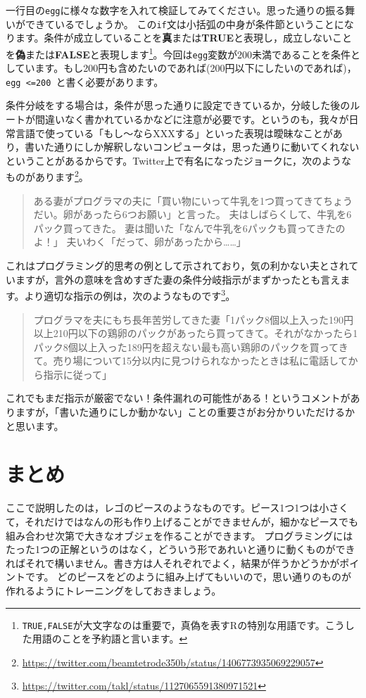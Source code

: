 \documentclass{ltjsbook}
\begin{document}
一行目の\verb|egg|に様々な数字を入れて検証してみてください。思った通りの振る舞いができているでしょうか。
この\texttt{if}文は小括弧の中身が条件節ということになります。条件が成立していることを\textbf{真}または\textbf{TRUE}と表現し，成立しないことを\textbf{偽}または\textbf{FALSE}と表現します\footnote{\texttt{TRUE,FALSE}が大文字なのは重要で，真偽を表すRの特別な用語です。こうした用語のことを予約語と言います。}。今回は\verb|egg|変数が200未満であることを条件としています。もし200円も含めたいのであれば(200円以下にしたいのであれば)，\verb|egg <=200 |と書く必要があります。

条件分岐をする場合は，条件が思った通りに設定できているか，分岐した後のルートが間違いなく書かれているかなどに注意が必要です。というのも，我々が日常言語で使っている「もし〜ならXXXする」といった表現は曖昧なことがあり，書いた通りにしか解釈しないコンピュータは，思った通りに動いてくれないということがあるからです。Twitter上で有名になったジョークに，次のようなものがあります\footnote{\url{https://twitter.com/beamtetrode350b/status/1406773935069229057}}。

\begin{quote}
ある妻がプログラマの夫に「買い物にいって牛乳を1つ買ってきてちょうだい。卵があったら6つお願い」と言った。
夫はしばらくして、牛乳を6パック買ってきた。
妻は聞いた「なんで牛乳を6パックも買ってきたのよ！」
夫いわく「だって、卵があったから……」
\end{quote}

これはプログラミング的思考の例として示されており，気の利かない夫とされていますが，言外の意味を含めすぎた妻の条件分岐指示がまずかったとも言えます。より適切な指示の例は，次のようなものです\footnote{\url{https://twitter.com/takl/status/1127065591380971521}}。

\begin{quote}
プログラマを夫にもち長年苦労してきた妻「1パック8個以上入った190円以上210円以下の鶏卵のパックがあったら買ってきて。それがなかったら1パック8個以上入った189円を超えない最も高い鶏卵のパックを買ってきて。売り場について15分以内に見つけられなかったときは私に電話してから指示に従って」
\end{quote}

これでもまだ指示が厳密でない！条件漏れの可能性がある！というコメントがありますが，「書いた通りにしか動かない」ことの重要さがお分かりいただけるかと思います。


\section{まとめ}
ここで説明したのは，レゴのピースのようなものです。ピース1つ1つは小さくて，それだけではなんの形も作り上げることができませんが，細かなピースでも組み合わせ次第で大きなオブジェを作ることができます。
プログラミングにはたった1つの正解というのはなく，どういう形であれいと通りに動くものができればそれで構いません。書き方は人それぞれでよく，結果が伴うかどうかがポイントです。
どのピースをどのように組み上げてもいいので，思い通りのものが作れるようにトレーニングをしておきましょう。
\end{document}
